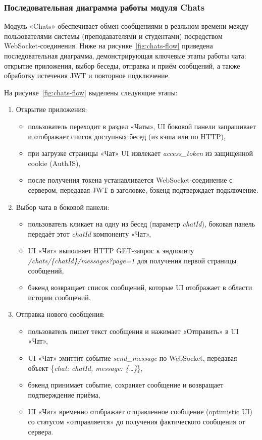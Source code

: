 \subsubsection{Последовательная диаграмма работы модуля Chats}
Модуль «Chats» обеспечивает обмен сообщениями в реальном времени между пользователями системы (преподавателями и студентами) посредством WebSocket-соединения. Ниже на рисунке~\ref{fig:chats-flow} приведена последовательная диаграмма, демонстрирующая ключевые этапы работы чата: открытие приложения, выбор беседы, отправка и приём сообщений, а также обработку истечения JWT и повторное подключение.

На рисунке~\ref{fig:chats-flow} выделены следующие этапы:

\begin{enumerate}
    \item Открытие приложения:
    \begin{itemize}
        \item пользователь переходит в раздел «Чаты», UI боковой панели запрашивает и отображает список доступных бесед (из кэша или по HTTP),
        \item при загрузке страницы «Чат» UI извлекает \textit{access\_token} из защищённой cookie (AuthJS),
        \item после получения токена устанавливается WebSocket-соединение с сервером, передавая JWT в заголовке, бэкенд подтверждает подключение.
    \end{itemize}

    \item Выбор чата в боковой панели:
    \begin{itemize}
        \item пользователь кликает на одну из бесед (параметр \textit{chatId}), боковая панель передаёт этот \textit{chatId} компоненту «Чат»,
        \item UI «Чат» выполняет HTTP GET-запрос к эндпоинту \textit{/chats/\{chatId\}/messages?page=1} для получения первой страницы сообщений,
        \item бэкенд возвращает список сообщений, которые UI отображает в области истории сообщений.
    \end{itemize}

    \item Отправка нового сообщения:
    \begin{itemize}
        \item пользователь пишет текст сообщения и нажимает «Отправить» в UI «Чат»,
        \item UI «Чат» эмиттит событие \textit{send\_message} по WebSocket, передавая объект \{\textit{chat: chatId, message: \{\ldots\}}\},
        \item бэкенд принимает событие, сохраняет сообщение и возвращает подтверждение приёма,
        \item UI «Чат» временно отображает отправленное сообщение (optimistic UI) со статусом «отправляется» до получения фактического сообщения от сервера.
    \end{itemize}


\end{enumerate}
